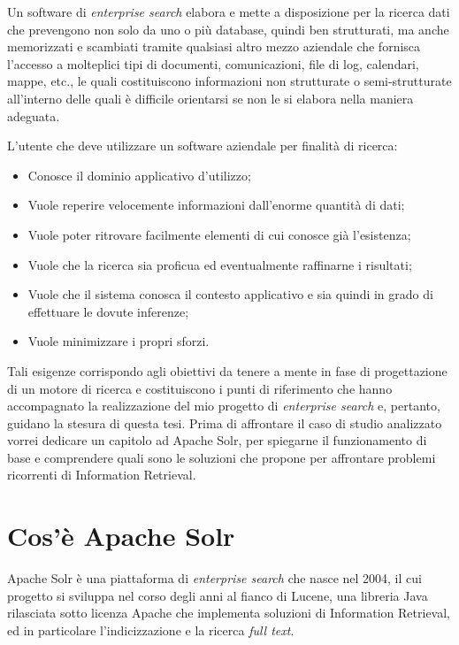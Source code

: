 Un software di \textit{enterprise search} elabora e mette a disposizione per la ricerca dati che prevengono non solo da uno o più database, quindi ben strutturati, ma anche memorizzati e scambiati tramite qualsiasi altro mezzo aziendale che fornisca l’accesso a molteplici tipi di documenti, comunicazioni, file di log, calendari, mappe, etc., le quali costituiscono informazioni non strutturate o semi-strutturate all’interno delle quali è difficile orientarsi se non le si elabora nella maniera adeguata.

\vspace{1em}

L’utente che deve utilizzare un software aziendale per finalità di ricerca:
\begin{itemize}
\item Conosce il dominio applicativo d’utilizzo;
\item Vuole reperire velocemente informazioni dall’enorme quantità di dati; 
\item Vuole poter ritrovare facilmente elementi di cui conosce già l’esistenza;
\item Vuole che la ricerca sia proficua ed eventualmente raffinarne i risultati;
\item Vuole che il sistema conosca il contesto applicativo e sia quindi in grado di effettuare le dovute inferenze;
\item Vuole minimizzare i propri sforzi.
\end{itemize}

\vspace{0.45em}

Tali esigenze corrispondo agli obiettivi da tenere a mente in fase di progettazione di un motore di ricerca e costituiscono i punti di riferimento che hanno accompagnato la realizzazione del mio progetto di \textit{enterprise search} e, pertanto, guidano la stesura di questa tesi. Prima di affrontare il caso di studio analizzato vorrei dedicare un capitolo ad Apache Solr, per spiegarne il funzionamento di base e comprendere quali sono le soluzioni che propone per affrontare problemi ricorrenti di Information Retrieval.




\section{Cos’è Apache Solr}

Apache Solr è una piattaforma di \textit{enterprise search} che nasce nel 2004, il cui progetto si sviluppa nel corso degli anni al fianco di Lucene, una libreria Java rilasciata sotto licenza Apache che implementa soluzioni di Information Retrieval, ed in particolare l’indicizzazione e la ricerca \textit{full text}.

